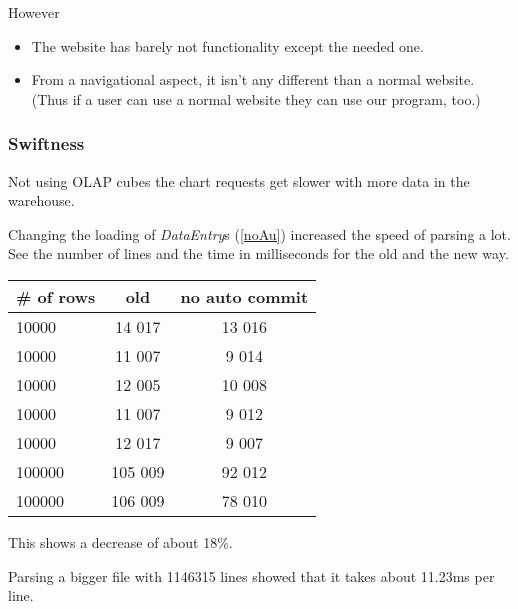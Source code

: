 However
\begin{itemize}
	\item The website has barely not functionality except the needed one.
	\item From a navigational aspect, it isn't any different than a normal website. 
	(Thus if a user can use a normal website they can use our program, too.)
\end{itemize}


\pagebreak[4]
\subsubsection{Swiftness}
Not using OLAP cubes the chart requests get slower with more data in the warehouse. %

Changing the loading of \textit{DataEntry}s (\ref{noAu}) increased
the speed of parsing a lot. See the number of lines and the time in milliseconds
for the old and the new way.

\begin{tabular}{l|c|c}
\# of rows & old & no auto commit \\
\hline
10000& 14 017 & 13 016\\
10000&11 007 &9 014\\
10000&12 005&10 008\\
10000&11 007&9 012\\
10000&12 017&9 007\\
100000&105 009 &92 012\\
100000&106 009 &78 010\\
\end{tabular}

This shows a decrease of about 18\%.

Parsing a bigger file with 1146315 lines showed
that it takes about 11.23ms per line. 
